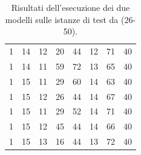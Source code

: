 \documentclass[12pt, italian, openany]{book}
\begin{document}
\begin{table}[]
\begin{tabular}{ll|lll|lll}
1           & 14           & 12   & 20        & 44    & 12   & 71        & 40   \\
1           & 14           & 11   & 59        & 72    & 13   & 65        & 40   \\
1           & 15           & 11   & 29        & 60    & 14   & 63        & 40   \\
1           & 15           & 12   & 26        & 44    & 14   & 67        & 40   \\
1           & 15           & 11   & 29        & 52    & 14   & 71        & 40   \\
1           & 15           & 12   & 45        & 44    & 14   & 66        & 40   \\
1           & 15           & 13   & 16        & 44    & 13   & 72        & 40   \\ \hline
\end{tabular}
\caption{Risultati dell'esecuzione dei due modelli sulle istanze di test da (26-50).}
\label{res2}
\end{table}
\end{document}
